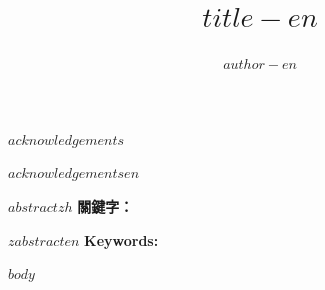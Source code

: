 \documentclass{ntuthesis}
\institute{$institute-en$}{$institute-zh$}
\title{$title-en$}{$title-zh$}
\author{$author-en$}{$author-zh$}
\begin{document}
\frontmatter

\makecover

\ifdefined\withcertification
  
\else
  \makecertification
\fi


%
\begin{acknowledgementszh}
$acknowledgements$
\end{acknowledgementszh}

\begin{acknowledgementsen}
$acknowledgementsen$
\end{acknowledgementsen}



\begin{abstractzh}
$abstractzh$
\bigbreak
\noindent \textbf{關鍵字：}{\, \makeatletter \@keywordszh \makeatother}
\end{abstractzh}

\begin{abstracten}
$zabstracten$
\bigbreak
\noindent \textbf{Keywords:}{\, \makeatletter \@keywordsen \makeatother}
\end{abstracten}

\tableofcontents
\listoffigures
\listoftables

\mainmatter

%
%
%
%
%
%
$body$


\appendix

\backmatter




\end{document}

